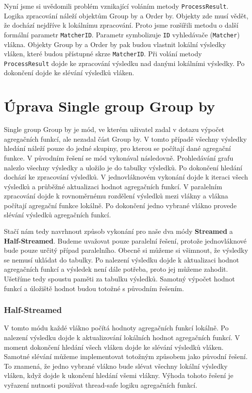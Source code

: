 Nyní jsme si uvědomili problém vznikající voláním metody \texttt{ProcessResult}.
Logika zpracování náleží objektům Group by a Order by.
Objekty zde musí vědět, že dochází nejdříve k lokálnímu zpracování.
Proto jsme rozšířili metodu o další formální parametr \texttt{MatcherID}.
Parametr symbolizuje \texttt{ID} vyhledávače (\texttt{Matcher}) vlákna.
Objekty Group by a Order by pak budou vlastnit lokální výsledky vláken, které budou přístupné skrze \texttt{MatcherID}.
Při volání metody \texttt{ProcessResult} dojde ke zpracování výsledku nad danými lokálními výsledky.
Po dokončení dojde ke slévání výsledků vláken.


\section{Úprava Single group Group by}

Single group Group by je mód, ve kterém uživatel zadal v dotazu výpočet agregačních funkcí, ale nezadal část Group by.
V tomto případě všechny výsledky hledání náleží pouze do jedné skupiny, pro kterou se počítají dané agregační funkce.
V původním řešení se mód vykonával následovně.
Prohledávání grafu nalezlo všechny výsledky a uložilo je do tabulky výsledků.
Po dokončení hledání dochází ke zpracování výsledků.
V jednovláknovém vykonání dojde k iteraci všech výsledků a průběžné aktualizaci hodnot agregačních funkcí.
V paralelním zpracování dojde k rovnoměrnému rozdělení výsledků mezi vlákny a vlákna počítají agregační funkce lokálně.
Po dokončení jedno vybrané vlákno provede slévání výsledků agregačních funkcí.

Stačí nám tedy navrhnout způsob vykonání pro naše dva módy \textbf{Streamed} a \textbf{Half-Streamed}.
Budeme uvažovat pouze paralelní řešení, protože jednovláknové bude pouze určitý případ paralelního.
Obecně si můžeme si všimnout, že výsledky se nemusí ukládat do tabulky.
Po nalezení výsledku dojde k aktualizaci hodnot agregačních funkcí a výsledek není dále potřeba, proto jej můžeme zahodit.
Ušetříme tedy spoustu paměti za tabulku výsledků.
Samotný výpočet hodnot funkcí a úložiště hodnot budou totožné s původním řešením.

\subsubsection{Half-Streamed}

V tomto módu každé vlákno počítá hodnoty agregačních funkcí lokálně.
Po nalezení výsledku dojde k aktualizování lokálních hodnot agregačních funkcí.
V moment dokončení hledání všech vláken dojde ke slévání výsledků vláken.
Samotné slévání můžeme implementovat totožným způsobem jako původní řešení.
To znamená, že jedno vybrané vlákno bude slévat všechny lokální výsledky vláken, když dojde k ukončení hledání všemi vlákny.
Výhoda tohoto řešení je vyřazení nutnosti používat thread-safe logiku agregačních funkcí.

